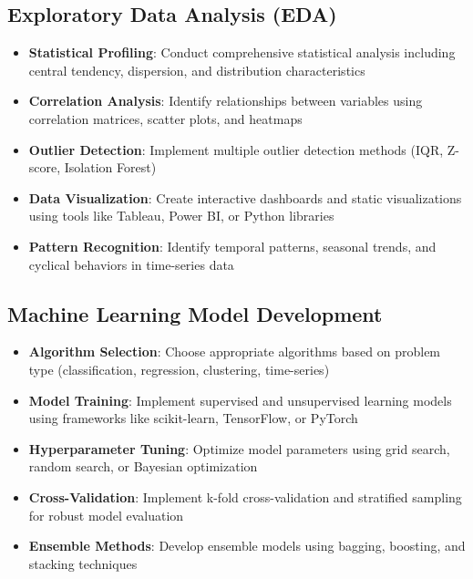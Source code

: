 \documentclass[11pt,a4paper]{article}
\begin{document}
\subsection{Exploratory Data Analysis (EDA)}
\begin{itemize}[leftmargin=*]
    \item \textbf{Statistical Profiling}: Conduct comprehensive statistical analysis including central tendency, dispersion, and distribution characteristics
    \item \textbf{Correlation Analysis}: Identify relationships between variables using correlation matrices, scatter plots, and heatmaps
    \item \textbf{Outlier Detection}: Implement multiple outlier detection methods (IQR, Z-score, Isolation Forest)
    \item \textbf{Data Visualization}: Create interactive dashboards and static visualizations using tools like Tableau, Power BI, or Python libraries
    \item \textbf{Pattern Recognition}: Identify temporal patterns, seasonal trends, and cyclical behaviors in time-series data
\end{itemize}

\subsection{Machine Learning Model Development}
\begin{itemize}[leftmargin=*]
    \item \textbf{Algorithm Selection}: Choose appropriate algorithms based on problem type (classification, regression, clustering, time-series)
    \item \textbf{Model Training}: Implement supervised and unsupervised learning models using frameworks like scikit-learn, TensorFlow, or PyTorch
    \item \textbf{Hyperparameter Tuning}: Optimize model parameters using grid search, random search, or Bayesian optimization
    \item \textbf{Cross-Validation}: Implement k-fold cross-validation and stratified sampling for robust model evaluation
    \item \textbf{Ensemble Methods}: Develop ensemble models using bagging, boosting, and stacking techniques
\end{itemize}
\end{document}
